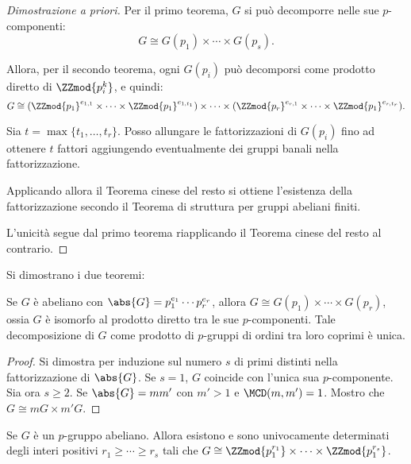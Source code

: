 \documentclass[12pt]{scrartcl}
\begin{document}
	\begin{proof}[Dimostrazione a priori]
		Per il primo teorema, $G$ si può decomporre nelle sue
		$p$-componenti:
		\[ G \cong G(p_1) \times \cdots \times G(p_s). \]
		
		
		Allora, per il secondo teorema, ogni $G(p_i)$ può
		decomporsi come prodotto diretto di $\ZZmod{p_i^k}$,
		e quindi:
		\[ G \cong (\ZZmod{p_1}^{e_{1,1}} \times \cdots \times \ZZmod{p_1}^{e_{1,t_1}}) \times \cdots \times (\ZZmod{p_r}^{e_{r,1}} \times \cdots \times \ZZmod{p_1}^{e_{r,t_r}}). \]
		
		
		Sia $t = \max\{t_1, \ldots, t_r\}$. Posso allungare le
		fattorizzazioni di $G(p_i)$ fino ad ottenere $t$ fattori aggiungendo eventualmente dei gruppi banali nella
		fattorizzazione. \medskip
		
		
		Applicando allora il Teorema cinese del resto si ottiene
		l'esistenza della fattorizzazione secondo il Teorema
		di struttura per gruppi abeliani finiti. 
		
		
		L'unicità segue dal primo teorema riapplicando il Teorema
		cinese del resto al contrario. %
	\end{proof}
	
	
	Si dimostrano i due teoremi:
	
	\begin{theorem}
		Se $G$ è abeliano con $\abs{G} = p_1^{e_1} \cdots p_r^{e_r}$, allora $G \cong G(p_1) \times \cdots \times G(p_r)$, ossia $G$ è isomorfo al prodotto diretto tra
		le sue $p$-componenti. Tale decomposizione di $G$
		come prodotto di $p$-gruppi di ordini tra loro
		coprimi è unica.
	\end{theorem}
	
	\begin{proof}
		Si dimostra per induzione sul numero $s$ di primi distinti
		nella fattorizzazione di $\abs{G}$. Se $s=1$,
		$G$ coincide con l'unica sua $p$-componente. Sia
		ora $s \geq 2$. Se $\abs{G} = m m'$ con $m'>1$ e
		$\MCD(m, m') = 1$. Mostro che $G \cong mG \times m'G$. \medskip
		
		
	\end{proof}
	
	\begin{theorem}
		Se $G$ è un $p$-gruppo abeliano. Allora esistono
		e sono univocamente determinati degli interi
		positivi $r_1 \geq \cdots \geq r_s$ tali che
		$G \cong \ZZmod{p_1^{r_1}} \times \cdots
		\times \ZZmod{p_1^{r_s}}$.
	\end{theorem}
\end{document}
